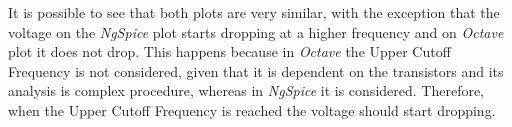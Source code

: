 It is possible to see that both plots are very similar, with the exception that the voltage on the \emph{NgSpice} plot starts dropping at a higher frequency and on \emph{Octave} plot it does not drop. This happens because in \emph{Octave} the Upper Cutoff Frequency is not considered, given that it is dependent on the transistors and its analysis is complex procedure, whereas in \emph{NgSpice} it is considered. Therefore, when the Upper Cutoff Frequency is reached the voltage should start dropping.


